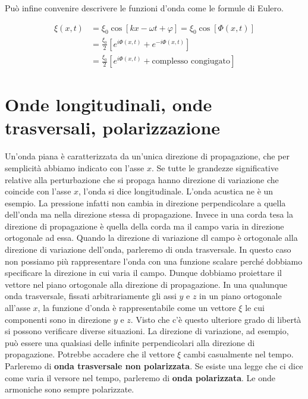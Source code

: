 Può infine convenire descrivere le funzioni d'onda come le formule di Eulero.

\begin{equation*}
	\begin{aligned}
		\xi(x,t) &= \xi_0\cos [kx-\omega t+\varphi] = \xi_0\cos [\Phi (x,t)] \\
		&= \frac{\xi_0}{2} [e^{i\Phi (x,t)} + e^{-i\Phi (x,t)}] \\
		&= \frac{\xi_0}{2} [e^{i\Phi (x,t)} + \text{complesso congiugato} ]
	\end{aligned}
\end{equation*}

\section{Onde longitudinali, onde trasversali, polarizzazione}

Un'onda piana è caratterizzata da un'unica direzione di propagazione, che per semplicità abbiamo indicato con l'asse $x$. Se tutte le grandezze significative relative
alla perturbazione che si propaga hanno direzione di
variazione che coincide con l'asse $x$, l'onda si dice longitudinale. L'onda acustica ne è un esempio. La pressione infatti non cambia in direzione perpendicolare a quella dell'onda ma nella direzione stessa di propagazione.
Invece in una corda tesa la direzione di propagazione è quella della corda ma il campo varia in direzione ortogonale ad essa. Quando la direzione di variazione dl campo è ortogonale alla direzione di variazione dell'onda, parleremo di onda trasversale. In questo caso non possiamo più rappresentare l'onda con una funzione scalare perché dobbiamo specificare la direzione in cui varia il campo. Dunque dobbiamo proiettare il vettore nel piano ortogonale alla direzione di propagazione. In una qualunque onda trasversale, fissati arbitrariamente gli assi $y$ e $z$ in un piano ortogonale all'asse $x$, la funzione d'onda è rappresentabile come un vettore $\xi$ le cui componenti sono in direzione $y$ e $z$. Visto che c'è questo ulteriore grado di libertà si possono verificare diverse situazioni. La direzione di variazione, ad esempio, può essere una qualsiasi delle infinite perpendicolari alla direzione di propagazione.
Potrebbe accadere che il vettore $\xi$ cambi casualmente nel tempo. Parleremo di \textbf{onda trasversale non polarizzata}. Se esiste una legge che ci dice come varia il versore nel tempo, parleremo di \textbf{onda polarizzata}. Le onde armoniche sono sempre polarizzate.

